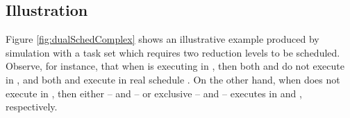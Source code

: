 \documentclass[twocolumn, compsocconf]{IEEEtran}
\newlength{\xtmp}
\newlength{\ytmp}
\newlength{\xtmpa}
\newlength{\ytmpa}
\newlength{\xtmpb}
\newlength{\ytmpb}
\newlength{\execWidth}
\newcounter{proc}
\newcounter{step}
\begin{document}
\subsection{Illustration}\label{sec:illustration}

Figure \ref{fig:dualSchedComplex} shows an illustrative example produced by
simulation with a task set which requires two reduction levels to be
scheduled. Observe, for instance, that when  is
executing in , then both  and  do not execute in
, and both  and  execute in real schedule . On the
other hand, when  does not execute in
, then either --  and  -- or exclusive --  and
 -- executes in  and , respectively.


\begin{figure}[t]
  \centering \setlength{\execWidth}{0.3\psyunit}

  \def\schedlocaxes(#1,#2){\setcounter{step}{#2}\multido{\nl=0+1}{\thestep}{\rput(\nl,-.25){\footnotesize \nl}}\multido{\i=0+1}{#1}{\setcounter{proc}{\i+1}\setlength{\ytmpa}{\i\psyunit+.14\psyunit}\setlength{\ytmpa}{\i\psyunit}\setlength{\ytmpb}{\i\psyunit-.07\psyunit}\setlength{\xtmpa}{#2\psxunit-0.7\psxunit}\psline[linewidth=0.5pt]{->}(0,\ytmpa)(\xtmpa,\ytmpa)\multido{\nt=0+1}{#2}{
        \psline[linestyle=solid,linewidth=0.5pt](\nt,\ytmpa)(\nt,\ytmpb)}}}
  \setlength{\execWidth}{0.35\psxunit}
  \def\joblocdead#1(#2,#3){\setcounter{proc}{#3-1}\setlength{\xtmpa}{#2\psxunit}\setlength{\ytmpa}{\theproc\psyunit}\setlength{\ytmpb}{\theproc\psyunit+\execWidth+0.27\psyunit}\psline[linestyle=solid,linewidth=0.5pt,arrows=-*,arrowsize=4pt]
    (\xtmpa,\ytmpa)(\xtmpa,\ytmpb)\ifthenelse{\equal{#1}{}}{}{\setlength{\ytmpa}{\theproc\psyunit+0.74\psyunit}\uput{.3em}[0](\xtmpa,\ytmpa){\vphantom{}\footnotesize #1}}}
  \def\jobcol#1#2(#3,#4,#5){\setcounter{proc}{#5-1}\setlength{\xtmpa}{#3\psxunit}\setlength{\ytmpa}{\theproc\psyunit}\setlength{\xtmpb}{#3\psxunit+#4\psxunit}\setlength{\ytmpb}{\theproc\psyunit+\execWidth}\psset{fillcolor=#1, linecolor=black,linestyle=solid,linewidth=0.5pt}\psframe[linecolor=black,fillstyle=solid] (\xtmpa,\ytmpa)(\xtmpb,\ytmpb)}
  \newcommand{\colA}{blue!50!white} \newcommand{\colB}{blue!90!white}
  \newcommand{\colAB}{blue!94!black}


\end{figure}
\end{document}
